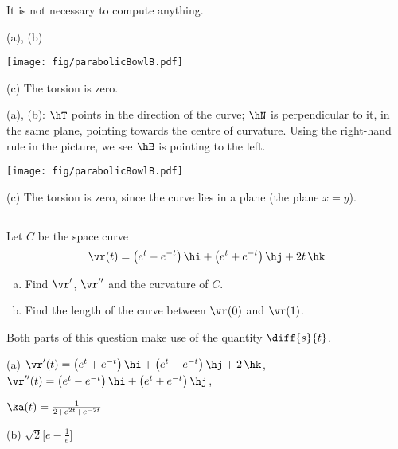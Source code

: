 \begin{hint} 
It is not necessary to compute anything.
\end{hint}

\begin{answer} 
(a), (b)

\begin{center}
       \texttt{[image: fig/parabolicBowlB.pdf]}
\end{center}

(c) 
The torsion is zero.
\end{answer}

\begin{solution} 
(a), (b): $\hT$ points in the direction of the curve; $\hN$ is perpendicular to it, in the same plane, pointing towards the centre of curvature. Using the right-hand rule in the picture, we see $\hB$ is pointing to the left.

\begin{center}
       \texttt{[image: fig/parabolicBowlB.pdf]}
\end{center}

(c) 
The torsion is zero, since the curve lies in a plane (the plane $x=y$).
\end{solution}



\subsection*{\Procedural}

\begin{question}[M317 2006A] %
Let $C$ be the space curve
\begin{align*}
\vr(t) = \big(e^t - e^{-t}\big)\,\hi + \big(e^t + e^{-t}\big)\,\hj +2t\,\hk
\end{align*}
\begin{enumerate}[(a)]
\item
Find $\vr'$, $\vr''$ and the curvature of $C$.
\item
Find the length of the curve between $\vr(0)$ and $\vr(1)$.
\end{enumerate}
\end{question}

\begin{hint} 
Both parts of this question make use of the quantity $\diff{s}{t}$.
\end{hint}

\begin{answer} 
(a) $\vr'(t)=\big(e^t + e^{-t}\big)\,\hi + \big(e^t - e^{-t}\big)\,\hj +2\,\hk$,
    $\vr''(t)=\big(e^t - e^{-t}\big)\,\hi + \big(e^t + e^{-t}\big)\,\hj$,

\hskip0.75in    $\ka(t) =\frac{1}{2+e^{2t}+e^{-2t}}$

(b) $\sqrt{2}\Big[e-\frac{1}{e}\Big]$
\end{answer}

